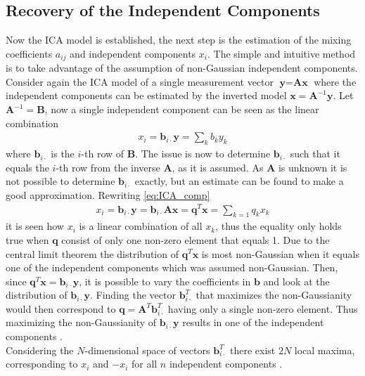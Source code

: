 \subsection{Recovery of the Independent Components}\label{sec:est_ica}
Now the ICA model is established, the next step is the estimation of the mixing coefficients $a_{ij}$ and independent components $x_i$. 
The simple and intuitive method is to take advantage of the assumption of non-Gaussian independent components. 
Consider again the ICA model of a single measurement vector $\textbf{y}=\textbf{Ax}$ where the independent components can be estimated by the inverted model $\textbf{x}=\textbf{A}^{-1}\textbf{y}$.  
Let $\textbf{A}^{-1}=\textbf{B}$, now a single independent component can be seen as the linear combination 
\begin{align}
x_i = \textbf{b}_{i \cdot} \textbf{y} = \sum_k b_k y_k \label{eq:ICA_comp}
\end{align} 
where $\textbf{b}_{i \cdot}$ is the $i$-th row of $\textbf{B}$. 
The issue is now to determine $\textbf{b}_{i\cdot}$ such that it equals the $i$-th row from the inverse $\textbf{A}$, as it is assumed. 
As $\textbf{A}$ is unknown it is not possible to determine $\textbf{b}_{i \cdot}$ exactly, but an estimate can be found to make a good approximation. Rewriting \eqref{eq:ICA_comp} 
\begin{align*}
x_i = \textbf{b}_{i \cdot} \textbf{y} = \textbf{b}_{i \cdot} \textbf{Ax} = \textbf{q}^T \textbf{x} = \sum_{k=1} q_k x_k
\end{align*}
it is seen how $x_i$ is a linear combination of all $x_k$, thus the equality only holds true when $\textbf{q}$ consist of only one non-zero element that equals 1.  
Due to the central limit theorem the distribution of $\textbf{q}^T\textbf{x}$ is most non-Gaussian when it equals one of the independent components which was assumed non-Gaussian. 
Then, since $\textbf{q}^T \textbf{x} = \textbf{b}_{i \cdot} \textbf{y}$, it is possible to vary the coefficients in $\textbf{b}$ and look at the distribution of $\textbf{b}_{i \cdot} \textbf{y}$. 
Finding the vector $\textbf{b}_{i\cdot}^T$ that maximizes the non-Gaussianity would then correspond to $\textbf{q} = \textbf{A}^T \textbf{b}_{i\cdot}^T$ having only a single non-zero element. 
Thus maximizing the non-Gaussianity of $\textbf{b}_{i \cdot} \textbf{y}$ results in one of the independent components \cite[p. 166]{ICA}. 
\\
Considering the $N$-dimensional space of vectors $\textbf{b}_{i\cdot}^T$ there exist $2N$ local maxima, corresponding to $x_i$ and $-x_i$ for all $n$ independent components \cite[p. 166]{ICA}. 

